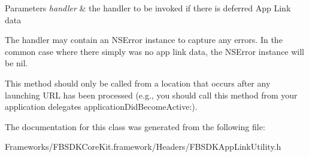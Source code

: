 \begin{DoxyParams}{Parameters}
{\em handler} & the handler to be invoked if there is deferred App Link data\\
\hline
\end{DoxyParams}
The handler may contain an N\+S\+Error instance to capture any errors. In the common case where there simply was no app link data, the N\+S\+Error instance will be nil.

This method should only be called from a location that occurs after any launching U\+R\+L has been processed (e.\+g., you should call this method from your application delegate\textquotesingle{}s application\+Did\+Become\+Active\+:). 

The documentation for this class was generated from the following file\+:\begin{DoxyCompactItemize}
\item 
Frameworks/\+F\+B\+S\+D\+K\+Core\+Kit.\+framework/\+Headers/F\+B\+S\+D\+K\+App\+Link\+Utility.\+h\end{DoxyCompactItemize}
